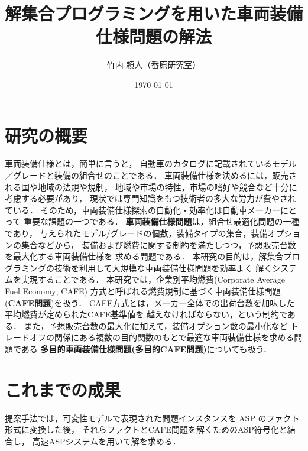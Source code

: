 \documentclass[a4j,10pt]{jarticle}
\title{解集合プログラミングを用いた車両装備仕様問題の解法}
\author{竹内 頼人（番原研究室）}
\date{\today}
\begin{document}
\maketitle
\thispagestyle{empty}
\begin{multicols}{1}

\section{研究の概要}
車両装備仕様とは，簡単に言うと，
自動車のカタログに記載されているモデル／グレードと装備の組合せのことである．
車両装備仕様を決めるには，販売される国や地域の法規や規制，
地域や市場の特性，市場の嗜好や競合など十分に考慮する必要があり，
現状では専門知識をもつ技術者の多大な労力が費やされている．
そのため，車両装備仕様探索の自動化・効率化は自動車メーカーにとって
重要な課題の一つである．
{\bf 車両装備仕様問題}は，組合せ最適化問題の一種であり，
与えられたモデル/グレードの個数，装備タイプの集合，装備オプションの集合などから，
装備および燃費に関する制約を満たしつつ，予想販売台数を最大化する車両装備仕様を
求める問題である．
本研究の目的は，解集合プログラミング\cite{baral_03,gelfond_88}の技術を利用して大規模な車両装備仕様問題を効率よく
解くシステムを実現することである．
本研究では，企業別平均燃費(Corporate Average Fuel Economy; CAFE)
方式と呼ばれる燃費規制に基づく車両装備仕様問題({\bf CAFE問題})を扱う．
CAFE方式とは，メーカー全体での出荷台数を加味した平均燃費が定められたCAFE基準値を
越えなければならない，という制約である．
また，予想販売台数の最大化に加えて，装備オプション数の最小化など
トレードオフの関係にある複数の目的関数のもとで最適な車両装備仕様を求める問題である
{\bf 多目的車両装備仕様問題(多目的CAFE問題)}についても扱う．





\section{これまでの成果}
提案手法では，可変性モデルで表現された問題インスタンスを ASP のファクト形式に変換した後，
それらファクトとCAFE問題を解くためのASP符号化と結合し，
高速ASPシステムを用いて解を求める．


\end{multicols}
\end{document}
